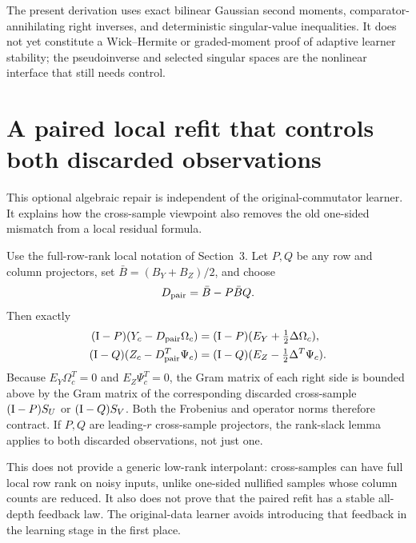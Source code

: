 \documentclass[11pt,oneside,openany,a4paper]{book}
\numberwithin{equation}{chapter}
\theoremstyle{definition}
\theoremstyle{remark}
\newcommand{\R}{\mathbb R}\newcommand{\E}{\mathbb E}\newcommand{\Prb}{\mathbb P}\newcommand{\PP}{\mathbb P}
\newcommand{\F}[1]{\left\lVert#1\right\rVert_F}
\newcommand{\op}[1]{\left\lVert#1\right\rVert_{\rm op}}
\DeclareMathOperator{\tr}{tr}\DeclareMathOperator{\rank}{rank}
\DeclareMathOperator{\diag}{blockdiag}\DeclareMathOperator{\range}{range}
\DeclareMathOperator{\ran}{range}\DeclareMathOperator{\OPT}{OPT}
\newcommand{\HH}{\mathcal H}\newcommand{\SSS}{\mathcal S}
\begin{document}
The present derivation uses exact bilinear Gaussian second moments, comparator-annihilating right inverses, and deterministic singular-value inequalities. It does not yet constitute a Wick--Hermite or graded-moment proof of adaptive learner stability; the pseudoinverse and selected singular spaces are the nonlinear interface that still needs control.


\section{A paired local refit that controls both discarded observations}
This optional algebraic repair is independent of the original-commutator learner. It explains how the cross-sample viewpoint also removes the old one-sided mismatch from a local residual formula.

Use the full-row-rank local notation of Section~3. Let $P,Q$ be any row and column projectors, set $\bar B=(B_Y+B_Z)/2$, and choose
\[
 D_{\rm pair}=\bar B-P\bar BQ.
\]
Then exactly
\begin{align}
 (\Id-P)(Y_c-D_{\rm pair}\Omega_c)
  &=(\Id-P)(E_Y+\tfrac12\Delta\Omega_c),\label{comm:eq:pairedU}\\
 (\Id-Q)(Z_c-D_{\rm pair}^T\Psi_c)
  &=(\Id-Q)(E_Z-\tfrac12\Delta^T\Psi_c).\label{comm:eq:pairedV}
\end{align}
Because $E_Y\Omega_c^T=0$ and $E_Z\Psi_c^T=0$, the Gram matrix of each right side is bounded above by the Gram matrix of the corresponding discarded cross-sample $(\Id-P)S_U$ or $(\Id-Q)S_V$. Both the Frobenius and operator norms therefore contract. If $P,Q$ are leading-$r$ cross-sample projectors, the rank-slack lemma applies to both discarded observations, not just one.

This does not provide a generic low-rank interpolant: cross-samples can have full local row rank on noisy inputs, unlike one-sided nullified samples whose column counts are reduced. It also does not prove that the paired refit has a stable all-depth feedback law. The original-data learner avoids introducing that feedback in the learning stage in the first place.

\endgroup

\begingroup
\let\E\relax
\newcommand{\E}{\mathbb E}
\let\PP\relax
\newcommand{\PP}{\mathbb P}
\let\R\relax
\newcommand{\R}{\mathbb R}
\let\F\relax
\newcommand{\F}[1]{\lVert #1\rVert_F}
\let\op\relax
\newcommand{\op}[1]{\lVert #1\rVert_{\rm op}}
\let\ran\relax
\newcommand{\ran}{\operatorname{range}}
\let\rank\relax
\newcommand{\rank}{\operatorname{rank}}
\let\diag\relax
\newcommand{\diag}{\operatorname{blockdiag}}
\let\dist\relax
\newcommand{\dist}{\operatorname{dist}}
\let\OPT\relax
\newcommand{\OPT}{\operatorname{OPT}}
\let\HH\relax
\newcommand{\HH}{\mathcal H}
\let\SSS\relax
\newcommand{\SSS}{\mathcal S}
\let\Id\relax
\newcommand{\Id}{\mathrm I}
\let\tr\relax
\newcommand{\tr}{\operatorname{tr}}
\end{document}
